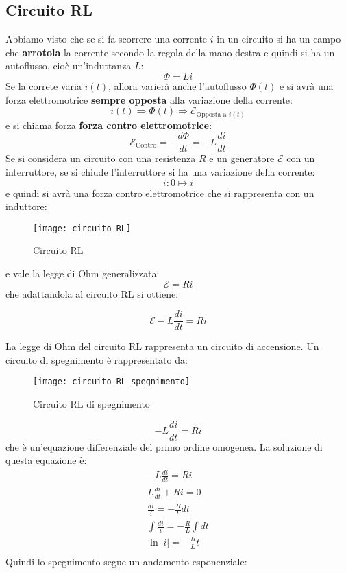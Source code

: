 \documentclass[a4paper]{article}
\begin{document}
\subsection{Circuito RL}
Abbiamo visto che se si fa scorrere una corrente \( i \) in un circuito si ha un campo
che \textbf{arrotola} la corrente secondo la regola della mano destra e quindi si ha
un autoflusso, cioè un'induttanza \( L \):
\[
  \Phi = Li
\] 
Se la correte varia \( i(t) \), allora varierà anche l'autoflusso \( \Phi(t) \) e si
avrà una forza elettromotrice \textbf{sempre opposta} alla variazione della corrente:
\[
  i(t) \Rightarrow \Phi(t) \Rightarrow \mathcal{E}_{\text{Opposta a } i(t)}
\] 
e si chiama forza \textbf{forza contro elettromotrice}:
\[
  \mathcal{E}_{\text{Contro}} = - \frac{d \Phi }{dt} = - L \frac{di}{dt}
\] 
Se si considera un circuito con una resistenza \( R \) e un generatore \( \mathcal{E} \)
con un interruttore, se si chiude l'interruttore si ha una variazione della corrente:
\[
  i: 0 \mapsto i
\] 
e quindi si avrà una forza contro elettromotrice che si rappresenta con un induttore:
\begin{figure}[H]
  \centering
  \texttt{[image: circuito\_RL]}
  \caption{Circuito RL}
\end{figure}
e vale la legge di Ohm generalizzata:
\[
  \mathcal{E} = Ri
\] 
che adattandola al circuito RL si ottiene: 
\begin{definition}
  \[
    \mathcal{E} - L \frac{di}{dt} = Ri
  \] 
\end{definition}
La legge di Ohm del circuito RL rappresenta un circuito di accensione. Un circuito di
spegnimento è rappresentato da:
\begin{figure}[H]
  \centering
  \texttt{[image: circuito\_RL\_spegnimento]}
  \caption{Circuito RL di spegnimento}
\end{figure}
\[
  - L \frac{di}{dt} = Ri
\] 
che è un'equazione differenziale del primo ordine omogenea. La soluzione di questa
equazione è:
\[
  \begin{aligned}
    - L \frac{di}{dt} = Ri\\
    L \frac{di}{dt} + Ri = 0\\
    \frac{di}{i} = - \frac{R}{L} dt\\
    \int \frac{di}{i} = - \frac{R}{L} \int dt\\
    \ln |i| = - \frac{R}{L} t\\
  \end{aligned}
\] 
Quindi lo spegnimento segue un andamento esponenziale:
\end{document}
